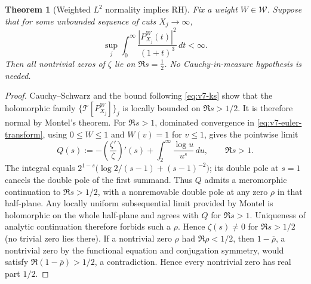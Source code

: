 \documentclass[11pt,a4paper]{article}
\numberwithin{equation}{section}
\newtheorem{theorem}{Theorem}[section]
\theoremstyle{definition}
\theoremstyle{remark}
\begin{document}
\begin{theorem}[Weighted $L^2$ normality implies RH]
\label{thm:v7-normality}
Fix a weight $W\in\mathcal W$. Suppose that for some unbounded
sequence of cuts $X_j\to\infty$,
\begin{equation}\label{eq:v7-normality-assumption}
\sup_j \int_0^\infty
\frac{|P_{X_j}^W(t)|^2}{(1+t)^3}\,dt<\infty.
\end{equation}
Then all nontrivial zeros of $\zeta$ lie on $\Re s=\tfrac12$.
No Cauchy-in-measure hypothesis is needed.
\end{theorem}
\begin{proof}
Cauchy--Schwarz and the bound following \eqref{eq:v7-ks}
show that the holomorphic family
$\{\mathcal T[P_{X_j}^W]\}_j$ is locally bounded on
$\Re s>1/2$. It is therefore normal by Montel's theorem.
For $\Re s>1$, dominated convergence in
\eqref{eq:v7-euler-transform}, using $0\le W\le1$ and
$W(v)=1$ for $v\le1$, gives the pointwise limit
\begin{equation}\label{eq:v7-meromorphic-limit}
 Q(s):=-\left(\frac{\zeta'}\zeta\right)'(s)
 +\int_2^\infty\frac{\log u}{u^s}\,du,
 \qquad\Re s>1.
\end{equation}
The integral equals
$2^{1-s}\bigl(\log2/(s-1)+(s-1)^{-2}\bigr)$;
its double pole at $s=1$ cancels the double pole of the
first summand. Thus $Q$ admits a meromorphic continuation
to $\Re s>1/2$, with a nonremovable double pole at any
zero $\rho$ in that half-plane. Any locally uniform
subsequential limit provided by Montel is holomorphic on the
whole half-plane and agrees with $Q$ for $\Re s>1$.
Uniqueness of analytic continuation therefore forbids
such a $\rho$. Hence $\zeta(s)\neq0$ for $\Re s>1/2$ (no trivial zero lies there). If a nontrivial zero $\rho$ had $\Re\rho<1/2$, then $1-\overline\rho$, a nontrivial zero by the functional equation and conjugation symmetry, would satisfy $\Re(1-\overline\rho)>1/2$, a contradiction. Hence every nontrivial zero has real part $1/2$.
\end{proof}
\end{document}
